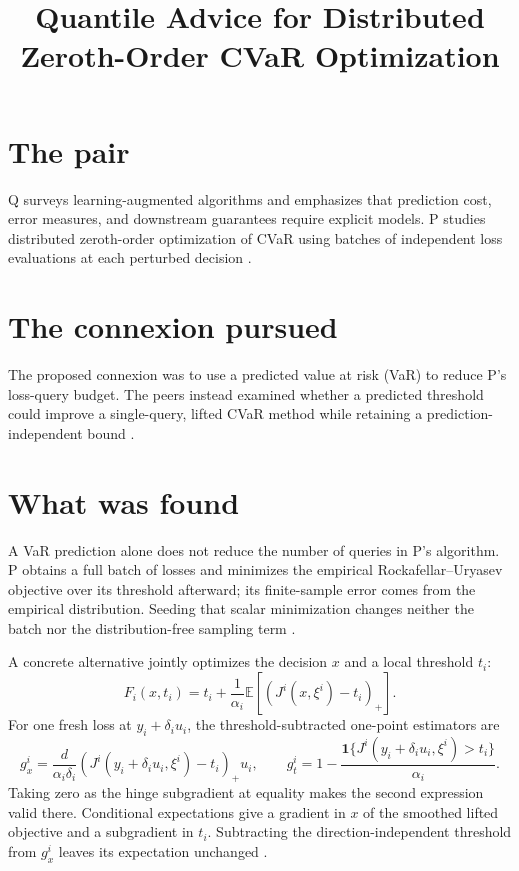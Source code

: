\documentclass{article}
\title{Quantile Advice for Distributed Zeroth-Order CVaR Optimization}
\begin{document}
\maketitle

\section{The pair}

Q surveys learning-augmented algorithms and emphasizes that prediction cost, error measures, and downstream guarantees require explicit models. P studies distributed zeroth-order optimization of CVaR using batches of independent loss evaluations at each perturbed decision .

\section{The connexion pursued}

The proposed connexion was to use a predicted value at risk (VaR) to reduce P's loss-query budget. The peers instead examined whether a predicted threshold could improve a single-query, lifted CVaR method while retaining a prediction-independent bound .

\section{What was found}

\begin{objection}
A VaR prediction alone does not reduce the number of queries in P's algorithm. P obtains a full batch of losses and minimizes the empirical Rockafellar--Uryasev objective over its threshold afterward; its finite-sample error comes from the empirical distribution. Seeding that scalar minimization changes neither the batch nor the distribution-free sampling term .
\end{objection}

A concrete alternative jointly optimizes the decision \(x\) and a local threshold \(t_i\):
\[
F_i(x,t_i)
=t_i+\frac{1}{\alpha_i}
\mathbb E\!\left[(J^i(x,\xi^i)-t_i)_+\right].
\]
For one fresh loss at \(y_i+\delta_i u_i\), the threshold-subtracted one-point estimators are
\[
g_x^i=
\frac{d}{\alpha_i\delta_i}
(J^i(y_i+\delta_i u_i,\xi^i)-t_i)_+u_i,
\qquad
g_t^i=1-\frac{\mathbf 1\{J^i(y_i+\delta_i u_i,\xi^i)>t_i\}}{\alpha_i}.
\]
Taking zero as the hinge subgradient at equality makes the second expression valid there. Conditional expectations give a gradient in \(x\) of the smoothed lifted objective and a subgradient in \(t_i\). Subtracting the direction-independent threshold from \(g_x^i\) leaves its expectation unchanged .
\end{document}
